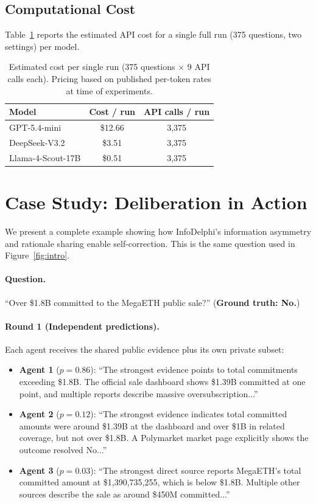 \documentclass[11pt]{article}
\theoremstyle{plain}
\theoremstyle{definition}
\begin{document}
\subsection{Computational Cost}
\label{sec:appendix_cost}

Table~\ref{tab:cost} reports the estimated API cost for a single full run (375 questions, two settings) per model.

\begin{table}[h]
\centering
\small
\begin{tabular}{lcc}
\toprule
\textbf{Model} & \textbf{Cost / run} & \textbf{API calls / run} \\
\midrule
GPT-5.4-mini & \$12.66 & 3{,}375 \\
DeepSeek-V3.2 & \$3.51 & 3{,}375 \\
Llama-4-Scout-17B & \$0.51 & 3{,}375 \\
\bottomrule
\end{tabular}
\caption{Estimated cost per single run (375 questions $\times$ 9 API calls each). Pricing based on published per-token rates at time of experiments.}
\label{tab:cost}
\end{table}

\section{Case Study: Deliberation in Action}
\label{sec:appendix_case}

We present a complete example showing how InfoDelphi's information asymmetry and rationale sharing enable self-correction. This is the same question used in Figure~\ref{fig:intro}.

\paragraph{Question.} ``Over \$1.8B committed to the MegaETH public sale?'' (\textbf{Ground truth: No.})

\paragraph{Round 1 (Independent predictions).}
Each agent receives the shared public evidence plus its own private subset:

\begin{itemize}[nosep,leftmargin=15pt]
\item \textbf{Agent 1} ($p = 0.86$): ``The strongest evidence points to total commitments exceeding \$1.8B. The official sale dashboard shows \$1.39B committed at one point, and multiple reports describe massive oversubscription...''
\item \textbf{Agent 2} ($p = 0.12$): ``The strongest evidence indicates total committed amounts were around \$1.39B at the dashboard and over \$1B in related coverage, but not over \$1.8B. A Polymarket market page explicitly shows the outcome resolved No...''
\item \textbf{Agent 3} ($p = 0.03$): ``The strongest direct source reports MegaETH's total committed amount at \$1,390,735,255, which is below \$1.8B. Multiple other sources describe the sale as around \$450M committed...''
\end{itemize}
\end{document}
